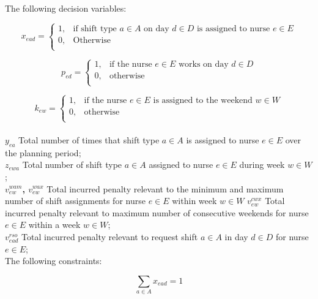 The following decision variables:

$$%
x_{ead} = 
 \left \{
 \begin{array}{cc}
    1, & \mbox{if shift type $a \in A$ on day $d \in D$ is assigned to nurse $e \in E$} \\
    0, & \mbox{Otherwise} \\
 \end{array}
 \right.
$$%

$$%
p_{ed} = 
 \left \{
 \begin{array}{cc}
    1, & \mbox{if the nurse $e \in E$ works on day $d \in D$} \\
    0, & \mbox{otherwise} \\
 \end{array}
 \right.
$$%
 
$$%
k_{ew} = 
 \left \{
 \begin{array}{cc}
    1, & \mbox{if the nurse $e \in E$ is assigned to the weekend $w \in W$} \\
    0, & \mbox{otherwise} \\
 \end{array}
 \right.
$$\\%

\textbf{$y_{ea}$} Total number of times that shift type $a \in A$ is assigned to nurse $e \in E$ over the planning period; \\
\textbf{$z_{ewa}$} Total number of shift type $a \in A$ assigned to nurse $e \in E$ during week $w \in W$; \\
\textbf{$v_{ew}^{wam}$, $v_{ew}^{wax}$} Total incurred penalty relevant to the minimum and maximum number of shift assignments for nurse $e \in E$ within week $w \in W$ 
\textbf{$v_{ew}^{cwx}$} Total incurred penalty relevant to maximum number of consecutive weekends for nurse $e \in E$ within a week $w \in W$; \\
\textbf{$v_{ead}^{rso}$} Total incurred penalty relevant to request shift $a \in A$ in day $d \in D$ for nurse $e \in E$; \\


The following constraints:

\begin{equation} \label{um}
\sum_{a \in A} x_{ead} = 1
\end{equation}

